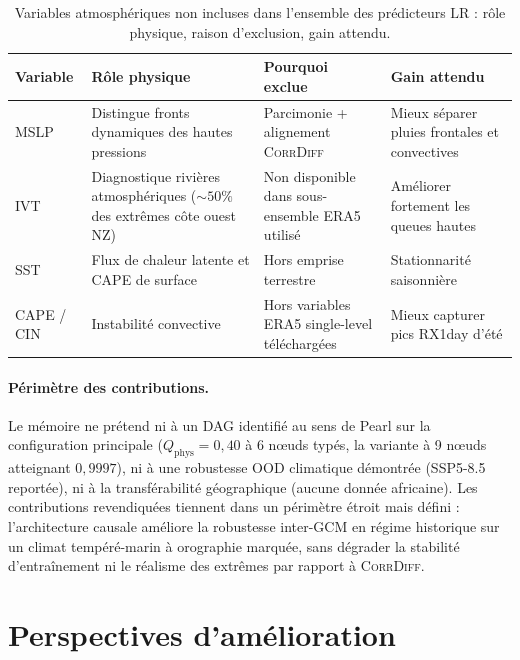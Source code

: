 \documentclass[14pt,a4paper,openany]{extreport}
\newcommand{\CorrDiff}{\textsc{CorrDiff}}
\newcommand{\LR}{\ensuremath{\text{LR}}}
\begin{document}
\begin{table}[H]
  \centering
  \small
  \caption[Variables atmosphériques omises]{Variables atmosphériques non incluses dans l'ensemble des prédicteurs \LR{} : rôle physique, raison d'exclusion, gain attendu.}
  \label{tab:exp-vars-missing}
  \begin{tabularx}{\linewidth}{l X X X}
    \toprule
    \textbf{Variable} & \textbf{Rôle physique} & \textbf{Pourquoi exclue} & \textbf{Gain attendu} \\
    \midrule
    MSLP & Distingue fronts dynamiques des hautes pressions & Parcimonie + alignement \CorrDiff{} & Mieux séparer pluies frontales et convectives \\
    IVT & Diagnostique rivières atmosphériques ($\sim 50\%$ des extrêmes côte ouest NZ) & Non disponible dans sous-ensemble ERA5 utilisé & Améliorer fortement les queues hautes \\
    SST & Flux de chaleur latente et CAPE de surface & Hors emprise terrestre & Stationnarité saisonnière \\
    CAPE / CIN & Instabilité convective & Hors variables ERA5 single-level téléchargées & Mieux capturer pics RX1day d'été \\
    \bottomrule
  \end{tabularx}
\end{table}

\paragraph{Périmètre des contributions.} Le mémoire ne prétend ni à un DAG identifié au sens de Pearl sur la configuration principale ($Q_{\mathrm{phys}}=0{,}40$ à 6 nœuds typés, la variante à 9 nœuds atteignant $0{,}9997$), ni à une robustesse OOD climatique démontrée (SSP5-8.5 reportée), ni à la transférabilité géographique (aucune donnée africaine). Les contributions revendiquées tiennent dans un périmètre étroit mais défini : l'architecture causale améliore la robustesse inter-GCM en régime historique sur un climat tempéré-marin à orographie marquée, sans dégrader la stabilité d'entraînement ni le réalisme des extrêmes par rapport à \CorrDiff{}.

\section{Perspectives d'amélioration}
\label{sec:exp-perspectives}
\end{document}
